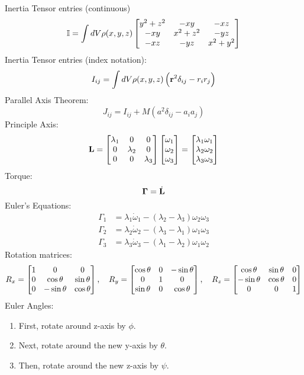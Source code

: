 \documentclass[../PHYS306Notes.tex]{subfiles}
\begin{document}
Inertia Tensor entries (continuous)
\[\mathbb{I} = \int dV\rho(x, y, z)\begin{bmatrix}y^2 + z^2 & -xy & -xz \\ -xy & x^2 + z^2 & -yz \\ -xz & -yz & x^2 + y^2
\end{bmatrix}\]
Inertia Tensor entries (index notation):
\begin{equation}
    I_{ij} = \int dV\rho(x, y, z)\left(\mathbf{r}^2\delta_{ij} - r_ir_j\right)
\end{equation}
Parallel Axis Theorem:
\begin{equation}
    J_{ij} = I_{ij} + M(a^2\delta_{ij} - a_ia_j)
\end{equation}
Principle Axis:
\begin{equation}
    \mathbf{L} = \begin{bmatrix}\lambda_1 & 0 & 0 \\ 0 & \lambda_2 & 0 \\ 0 & 0 & \lambda_3\end{bmatrix}\begin{bmatrix}\omega_1 \\ \omega_2 \\ \omega_3\end{bmatrix} = \begin{bmatrix}\lambda_1\omega_1 \\ \lambda_2\omega_2 \\ \lambda_3\omega_3\end{bmatrix}
\end{equation}
Torque:
\begin{equation}
    \bm{\Gamma} = \dot{\mathbf{L}}
\end{equation}
Euler's Equations:
\begin{equation} \label{eq1}
\begin{split}
\Gamma_1 &= \lambda_1\dot{\omega}_1 - (\lambda_2 - \lambda_3)\omega_2\omega_3 \\
\Gamma_2 &= \lambda_2\dot{\omega}_2 - (\lambda_3 - \lambda_1)\omega_1\omega_3\\
\Gamma_3 &= \lambda_3\dot{\omega}_3 - (\lambda_1 - \lambda_2)\omega_1\omega_2
\end{split}
\end{equation}
Rotation matrices:
\begin{equation}
    R_x = \begin{bmatrix}1 & 0 & 0 \\ 0 & \cos\theta & \sin\theta \\ 0 & -\sin\theta & \cos\theta\end{bmatrix}, \quad R_y = \begin{bmatrix}\cos\theta & 0 & -\sin\theta \\ 0 & 1 & 0 \\ \sin\theta & 0 & \cos\theta\end{bmatrix}, \quad R_z = \begin{bmatrix}\cos\theta & \sin\theta & 0 \\ -\sin\theta & \cos\theta & 0 \\ 0 & 0 & 1\end{bmatrix}
\end{equation}
Euler Angles:
\begin{enumerate}[1.]
    \item First, rotate around z-axis by $\phi$.
    \item Next, rotate around the new y-axis by $\theta$.
    \item Then, rotate around the new z-axis by $\psi$.
\end{enumerate}
\end{document}
